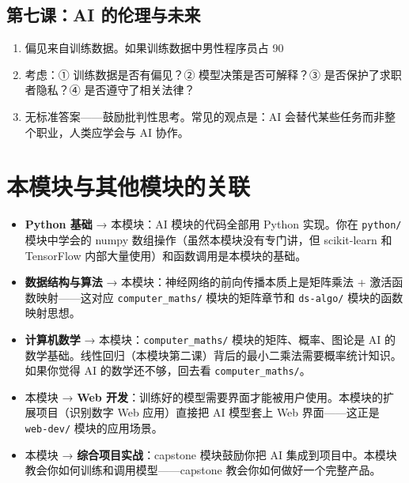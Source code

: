 \documentclass[a4paper,12pt]{ctexart}
\begin{document}
\subsection*{第七课：AI 的伦理与未来}
\begin{enumerate}
  \item 偏见来自训练数据。如果训练数据中男性程序员占 90%
  \item 考虑：① 训练数据是否有偏见？② 模型决策是否可解释？③ 是否保护了求职者隐私？④ 是否遵守了相关法律？
  \item 无标准答案——鼓励批判性思考。常见的观点是：AI 会替代某些任务而非整个职业，人类应学会与 AI 协作。
\end{enumerate}

\section*{本模块与其他模块的关联}

\begin{itemize}
  \item \textbf{Python 基础} → 本模块：AI 模块的代码全部用 Python 实现。你在 \texttt{python/} 模块中学会的 numpy 数组操作（虽然本模块没有专门讲，但 scikit-learn 和 TensorFlow 内部大量使用）和函数调用是本模块的基础。
  \item \textbf{数据结构与算法} → 本模块：神经网络的前向传播本质上是矩阵乘法 + 激活函数映射——这对应 \texttt{computer\_maths/} 模块的矩阵章节和 \texttt{ds-algo/} 模块的函数映射思想。
  \item \textbf{计算机数学} → 本模块：\texttt{computer\_maths/} 模块的矩阵、概率、图论是 AI 的数学基础。线性回归（本模块第二课）背后的最小二乘法需要概率统计知识。如果你觉得 AI 的数学还不够，回去看 \texttt{computer\_maths/}。
  \item 本模块 → \textbf{Web 开发}：训练好的模型需要界面才能被用户使用。本模块的扩展项目（识别数字 Web 应用）直接把 AI 模型套上 Web 界面——这正是 \texttt{web-dev/} 模块的应用场景。
  \item 本模块 → \textbf{综合项目实战}：capstone 模块鼓励你把 AI 集成到项目中。本模块教会你如何训练和调用模型——capstone 教会你如何做好一个完整产品。
\end{itemize}
\end{document}
